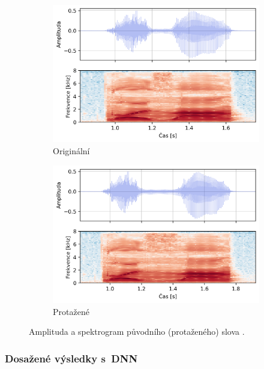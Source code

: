 \begin{figure}[htpb]
  \centering
  \begin{subfigure}[b]{0.42\textwidth}
    \includegraphics[width=\textwidth]{./ch6-realisation/img/energy_spec_word-kosa.png}
    \caption{Originální}
    \label{fig:realisation:augmentation:compare:original}
  \end{subfigure}
  \begin{subfigure}[b]{0.42\textwidth}
    \includegraphics[width=\textwidth]{./ch6-realisation/img/energy_spec_word-kosa_real.png}
    \caption{Protažené}
    \label{fig:realisation:augmentation:compare:augmented}
  \end{subfigure}
  \caption{Amplituda a spektrogram původního (protaženého) slova .}
  \label{fig:realisation:augmentation:compare}
\end{figure}

\subsubsection{Dosažené výsledky s~DNN}


